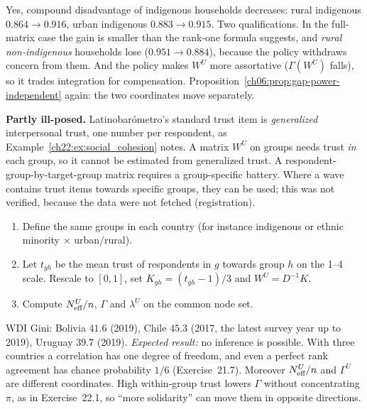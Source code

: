 \documentclass[../solutions_manual.tex]{subfiles}
\begin{document}
 Yes, compound disadvantage of indigenous households decreases: rural indigenous $0.864 \to 0.916$, urban indigenous $0.883 \to 0.915$. Two qualifications. In the full-matrix case the gain is smaller than the rank-one formula suggests, and \emph{rural non-indigenous} households lose ($0.951 \to 0.884$), because the policy withdraws concern from them. And the policy makes $W^U$ more assortative ($\Gamma(W^U)$ falls), so it trades integration for compensation. Proposition~\ref{ch06:prop:gap-power-independent} again: the two coordinates move separately.


\textbf{Partly ill-posed.} Latinobar\'ometro's standard trust item is \emph{generalized} interpersonal trust, one number per respondent, as Example~\ref{ch22:ex:social_cohesion} notes. A matrix $W^U$ on groups needs trust \emph{in} each group, so it cannot be estimated from generalized trust. A respondent-group-by-target-group matrix requires a group-specific battery. Where a wave contains trust items towards specific groups, they can be used; this was not verified, because the data were not fetched (registration).

\begin{enumerate}
\item Define the same groups in each country (for instance indigenous or ethnic minority $\times$ urban/rural).
\item Let $t_{gh}$ be the mean trust of respondents in $g$ towards group $h$ on the 1--4 scale. Rescale to $[0,1]$, set $K_{gh} = (t_{gh} - 1)/3$ and $W^U = D^{-1}K$.
\item Compute $N_{\text{eff}}^U/n$, $\Gamma$ and $\lambda^U$ on the common node set.
\end{enumerate}

 WDI Gini: Bolivia $41.6$ (2019), Chile $45.3$ (2017, the latest survey year up to 2019), Uruguay $39.7$ (2019). \emph{Expected result:} no inference is possible. With three countries a correlation has one degree of freedom, and even a perfect rank agreement has chance probability $1/6$ (Exercise~21.7). Moreover $N_{\text{eff}}^U/n$ and $\Gamma^U$ are different coordinates. High within-group trust lowers $\Gamma$ without concentrating $\pi$, as in Exercise~22.1, so ``more solidarity'' can move them in opposite directions.
\end{document}
